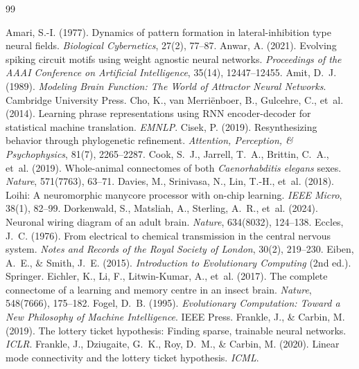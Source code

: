 \documentclass[10pt]{article}
\begin{document}
\begin{thebibliography}{99}

Amari, S.-I. (1977). Dynamics of pattern formation in lateral-inhibition type neural fields. \textit{Biological Cybernetics}, 27(2), 77--87.
Anwar, A. (2021). Evolving spiking circuit motifs using weight agnostic neural networks. \textit{Proceedings of the AAAI Conference on Artificial Intelligence}, 35(14), 12447--12455.
Amit, D.~J. (1989). \textit{Modeling Brain Function: The World of Attractor Neural Networks}. Cambridge University Press.
Cho, K., van Merri\"{e}nboer, B., Gulcehre, C., et~al. (2014). Learning phrase representations using RNN encoder-decoder for statistical machine translation. \textit{EMNLP}.
Cisek, P. (2019). Resynthesizing behavior through phylogenetic refinement. \textit{Attention, Perception, \& Psychophysics}, 81(7), 2265--2287.
Cook, S.~J., Jarrell, T.~A., Brittin, C.~A., et~al. (2019). Whole-animal connectomes of both \textit{Caenorhabditis elegans} sexes. \textit{Nature}, 571(7763), 63--71.
Davies, M., Srinivasa, N., Lin, T.-H., et~al. (2018). Loihi: A neuromorphic manycore processor with on-chip learning. \textit{IEEE Micro}, 38(1), 82--99.
Dorkenwald, S., Matsliah, A., Sterling, A.~R., et~al. (2024). Neuronal wiring diagram of an adult brain. \textit{Nature}, 634(8032), 124--138.
Eccles, J.~C. (1976). From electrical to chemical transmission in the central nervous system. \textit{Notes and Records of the Royal Society of London}, 30(2), 219--230.
Eiben, A.~E., \& Smith, J.~E. (2015). \textit{Introduction to Evolutionary Computing} (2nd ed.). Springer.
Eichler, K., Li, F., Litwin-Kumar, A., et~al. (2017). The complete connectome of a learning and memory centre in an insect brain. \textit{Nature}, 548(7666), 175--182.
Fogel, D.~B. (1995). \textit{Evolutionary Computation: Toward a New Philosophy of Machine Intelligence}. IEEE Press.
Frankle, J., \& Carbin, M. (2019). The lottery ticket hypothesis: Finding sparse, trainable neural networks. \textit{ICLR}.
Frankle, J., Dziugaite, G.~K., Roy, D.~M., \& Carbin, M. (2020). Linear mode connectivity and the lottery ticket hypothesis. \textit{ICML}.

\end{thebibliography}
\end{document}
